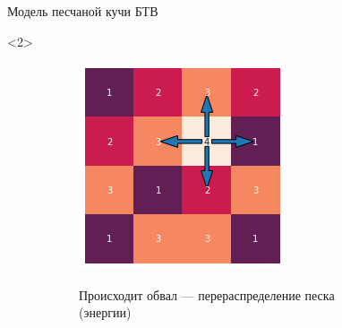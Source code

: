 \documentclass{beamer}
\begin{document}
\begin{frame}{Модель песчаной кучи БТВ}
		\begin{onlyenv}<2>
			\begin{figure}[ht]
				\centering
				\begin{subfigure}{0.45\textwidth}
					\includegraphics[width=\linewidth]{slides/btw_1}
				\end{subfigure}
				\begin{subfigure}{0.45\textwidth}
					Происходит обвал --- перераспределение песка (энергии)
				\end{subfigure}
			\end{figure}
		\end{onlyenv}
		

\end{frame}
\end{document}
